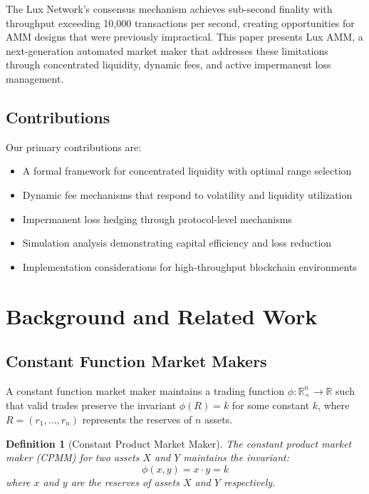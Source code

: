 \documentclass[11pt,a4paper]{article}
\newtheorem{definition}[theorem]{Definition}
\begin{document}
The Lux Network's consensus mechanism achieves sub-second finality with throughput exceeding 10,000 transactions per second, creating opportunities for AMM designs that were previously impractical. This paper presents Lux AMM, a next-generation automated market maker that addresses these limitations through concentrated liquidity, dynamic fees, and active impermanent loss management.

\subsection{Contributions}

Our primary contributions are:
\begin{itemize}
    \item A formal framework for concentrated liquidity with optimal range selection
    \item Dynamic fee mechanisms that respond to volatility and liquidity utilization
    \item Impermanent loss hedging through protocol-level mechanisms
    \item Simulation analysis demonstrating capital efficiency and loss reduction
    \item Implementation considerations for high-throughput blockchain environments
\end{itemize}

\section{Background and Related Work}

\subsection{Constant Function Market Makers}

A constant function market maker maintains a trading function $\phi: \mathbb{R}^n_+ \to \mathbb{R}$ such that valid trades preserve the invariant $\phi(R) = k$ for some constant $k$, where $R = (r_1, \ldots, r_n)$ represents the reserves of $n$ assets.

\begin{definition}[Constant Product Market Maker]
The constant product market maker (CPMM) for two assets $X$ and $Y$ maintains the invariant:
\begin{equation}
    \phi(x, y) = x \cdot y = k
\end{equation}
where $x$ and $y$ are the reserves of assets $X$ and $Y$ respectively.
\end{definition}
\end{document}
